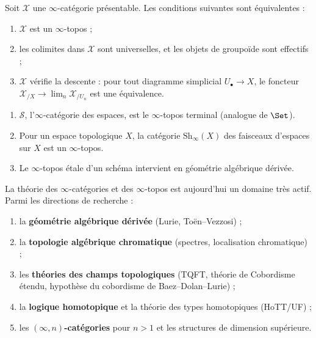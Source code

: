 \begin{theoreme}
\label{thm:giraud-infty}
Soit $\mathcal{X}$ une $\infty$-catégorie présentable.
Les conditions suivantes sont équivalentes :
\begin{enumerate}[label=(\alph*)]
\item $\mathcal{X}$ est un $\infty$-topos ;
\item les colimites dans $\mathcal{X}$ sont universelles, et les
      objets de groupoïde sont effectifs ;
\item $\mathcal{X}$ vérifie la descente : pour tout diagramme
      simplicial $U_\bullet \to X$, le foncteur
      $\mathcal{X}_{/X} \to \lim_n \mathcal{X}_{/U_n}$ est une
      équivalence.
\end{enumerate}
\end{theoreme}

\begin{exemple}\label{ex:infty-topos}
\begin{enumerate}[label=(\roman*)]
\item $\mathcal{S}$, l'$\infty$-catégorie des espaces, est le
      $\infty$-topos terminal (analogue de $\Set$).
\item Pour un espace topologique $X$, la catégorie
      $\mathrm{Sh}_\infty(X)$ des faisceaux d'espaces sur $X$ est
      un $\infty$-topos.
\item Le $\infty$-topos étale d'un schéma intervient en géométrie
      algébrique dérivée.
\end{enumerate}
\end{exemple}

\begin{remarque}[Perspectives]\label{rem:perspectives}
La théorie des $\infty$-catégories et des $\infty$-topos est
aujourd'hui un domaine très actif.  Parmi les directions de
recherche :
\begin{enumerate}[label=(\roman*)]
\item la \textbf{géométrie algébrique dérivée} (Lurie, Toën--Vezzosi) ;
\item la \textbf{topologie algébrique chromatique}
      (spectres, localisation chromatique) ;
\item les \textbf{théories des champs topologiques}
      (TQFT, théorie de Cobordisme étendu,
      hypothèse du cobordisme de Baez--Dolan--Lurie) ;
\item la \textbf{logique homotopique} et la théorie des types
      homotopiques (HoTT/UF) ;
\item les \textbf{$(\infty,n)$-catégories} pour $n > 1$ et les
      structures de dimension supérieure.
\end{enumerate}
\end{remarque}

